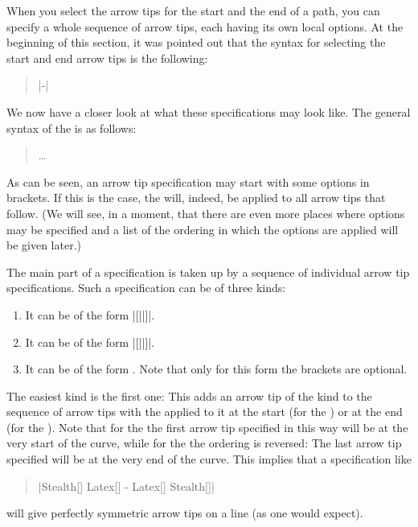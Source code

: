 When you select the arrow tips for the start and the end of a path, you can
specify a whole sequence of arrow tips, each having its own local options. At
the beginning of this section, it was pointed out that the syntax for selecting
the start and end arrow tips is the following:
%
\begin{quote}
    |-|
\end{quote}

We now have a closer look at what these specifications may look like. The
general syntax of the  is as follows:
%
\begin{quote}
     
      \dots
\end{quote}
%
As can be seen, an arrow tip specification may start with some options in
brackets. If this is the case, the  will, indeed, be
applied to all arrow tips that follow. (We will see, in a moment, that there
are even more places where options may be specified and a list of the ordering
in which the options are applied will be given later.)

The main part of a specification is taken up by a sequence of individual arrow
tip specifications. Such a specification can be of three kinds:
%
\begin{enumerate}
    \item It can be of the form |[||]|.
    \item It can be of the form |[||]|.
    \item It can be of the form . Note that only for this form
        the brackets are optional.
\end{enumerate}

The easiest kind is the first one: This adds an arrow tip of the kind
 to the sequence of arrow tips with the
 applied to it at the start (for the )
or at the end (for the ). Note that for the  the first arrow tip specified in this way will be at the very
start of the curve, while for the  the ordering is
reversed: The last arrow tip specified will be at the very end of the curve.
This implies that a specification like
%
\begin{quote}
    |Stealth[] Latex[] - Latex[] Stealth[]|
\end{quote}
%
will give perfectly symmetric arrow tips on a line (as one would expect).

